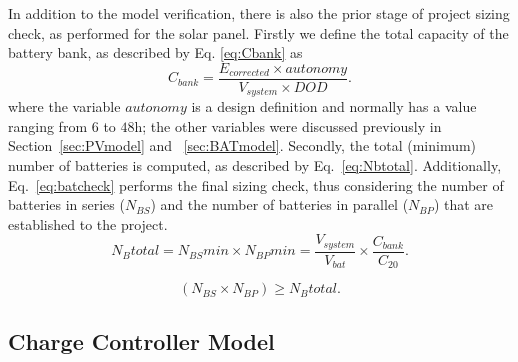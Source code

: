 \documentclass[journal]{IEEEtran}
\begin{document}
%
%
In addition to the model verification, there is also the prior stage of project sizing check, as performed for the solar panel. Firstly we define the total capacity of the battery bank, as described by Eq. \eqref{eq:Cbank} as
\begin{equation}
\label{eq:Cbank}
C_{bank} = \dfrac{E_{corrected} \times autonomy}{V_{system} \times DOD}.
\end{equation}
%
\noindent where the variable $autonomy$ is a design definition and normally has a value ranging from $6$ to $48$h; the other variables were discussed previously in Section~\ref{sec:PVmodel} and ~\ref{sec:BATmodel}.
%
Secondly, the total (minimum) number of batteries is computed, as described by Eq.~\eqref{eq:Nbtotal}. Additionally, Eq.~\eqref{eq:batcheck} performs the final sizing check, thus considering the number of batteries in series ($ N_{BS} $) and the number of batteries in parallel ($ N_{BP} $) that are established to the project.
\begin{equation}
\label{eq:Nbtotal}
N_{B}total = N_{BS}min \times N_{BP}min = \dfrac{V_{system}}{V_{bat}} \times \dfrac{C_{bank}}{C_{20}}.
\end{equation}

\begin{equation}
\label{eq:batcheck}
\left( N_{BS} \times  N_{BP} \right) \geq N_{B}total.
\end{equation}

\subsection{Charge Controller Model}

\end{document}

